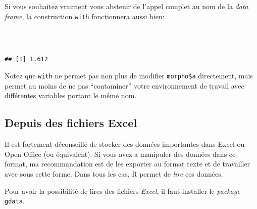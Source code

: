 Si vous souhaitez vraiment vous abstenir de l'appel complet au nom de la \emph{data frame}, la construction \texttt{with} fonctionnera aussi bien:

\begin{knitrout}
\color{fgcolor}\begin{kframe}
\begin{flushleft}
\ttfamily\noindent
{}\hlkeyword{(}\hlkeyword{,}{\ }\hlkeyword{\usebox{\hlnormalsizeboxopenbrace}}\hspace*{\fill}\\
\hlstd{}{\ }{\ }{\ }{\ }\hlkeyword{(}\hlkeyword{,}{\ }\hlargument{=}{\ }\hlkeyword{)}\hspace*{\fill}\\
\hlstd{}\hlkeyword{\usebox{\hlnormalsizeboxclosebrace}}\hlkeyword{)}\mbox{}
\normalfont
\end{flushleft}
\begin{verbatim}
## [1] 1.612
\end{verbatim}
\end{kframe}
\end{knitrout}


\noindent Notez que \texttt{with} ne permet pas non plus de modifier \texttt{morpho\$a} directement, mais permet au moins de ne pas ``contaminer'' votre environnement de travail avec différentes variables portant le même nom.

\subsection{Depuis des fichiers Excel}

Il est fortement déconseillé de stocker des données importantes dans Excel ou Open Office (ou équivalent).
Si vous avez a manipuler des données dans ce format, ma recommandation est de les exporter au format texte et de travailler avec sous cette forme.
Dans tous les cas, R permet de \emph{lire} ces données.

Pour avoir la possibilité de lires des fichiers \emph{Excel}, il faut installer le \emph{package} \texttt{gdata}.

\begin{knitrout}
\color{fgcolor}\begin{kframe}
\begin{flushleft}
\ttfamily\noindent
{}\hlkeyword{(}\hlkeyword{)}\mbox{}
\normalfont
\end{flushleft}
\end{kframe}
\end{knitrout}



